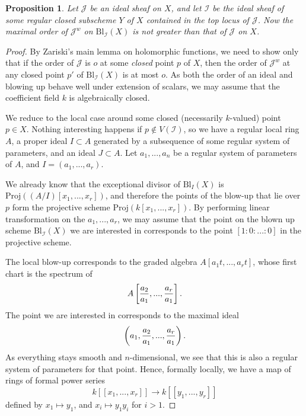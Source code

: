 \documentclass[12pt,a4paper,leqno]{article}
\newcommand{\bl}{\mathrm{Bl}}
\newcommand{\proj}{\mathrm{Proj}}
\theoremstyle{plain}
\newtheorem{prop}[theo]{Proposition}
\theoremstyle{definition}
\theoremstyle{remark}
\begin{document}
\begin{prop}
Let $\mathscr{J}$ be an ideal sheaf on $X$, and let $\mathscr{I}$ be the ideal sheaf of some regular closed subscheme $Y$ of $X$ contained in the top locus of $\mathscr{J}$. Now the maximal order of $\mathscr{J}^w$ on $\bl_{\mathscr{I}} (X)$ is not greater than that of $\mathscr{J}$ on $X$.
\end{prop}
\begin{proof}
By Zariski's main lemma on holomorphic functions, we need to show only that if the order of $\mathscr{J}$ is $o$ at some \emph{closed} point $p$ of $X$, then the order of $\mathscr{J}^w$ at any closed point $p'$ of $\bl_{\mathscr{I}} (X)$ is at most $o$. As both the order of an ideal and blowing up behave well under extension of scalars, we may assume that the coefficient field $k$ is algebraically closed.

We reduce to the local case around some closed (necessarily $k$-valued) point $p \in X$. Nothing interesting happens if $p \not\in V(\mathscr{I})$, so we have a regular local ring $A$, a proper ideal $I \subset A$ generated by a subsequence of some regular system of parameters, and an ideal $J \subset A$. Let $a_1,...,a_n$ be a regular system of parameters of $A$, and $I = (a_1,...,a_r)$. 


We already know that the exceptional divisor of $\bl_I (X)$ is $\proj ((A/I) [x_1,...,x_r])$, and therefore the points of the blow-up that lie over $p$ form the projective scheme $\proj (k[x_1,...,x_r])$. By performing linear transformation on the $a_1,...,a_r$, we may assume that the point on the blown up scheme $\bl_{\mathscr{I}} (X)$ we are interested in corresponds to the point $[1:0:...:0]$ in the projective scheme.

The local blow-up corresponds to the graded algebra $A[a_1 t, ..., a_r t]$, whose first chart is the spectrum of 
\begin{equation*}
A \left[ {a_2 \over a_1}, ... , {a_r \over a_1} \right].
\end{equation*}
The point we are interested in corresponds to the maximal ideal
\begin{equation*}
\left( a_1, {a_2 \over a_1}, ... , {a_r \over a_1} \right).
\end{equation*}
As everything stays smooth and $n$-dimensional, we see that this is also a regular system of parameters for that point. Hence, formally locally, we have a map of rings of formal power series
\begin{equation*}
k[[x_1,...,x_r]] \to k[[y_1,...,y_r]]
\end{equation*}
defined by $x_1 \mapsto y_1$, and $x_i \mapsto y_1 y_i$ for $i>1$.


\end{proof}
\end{document}
